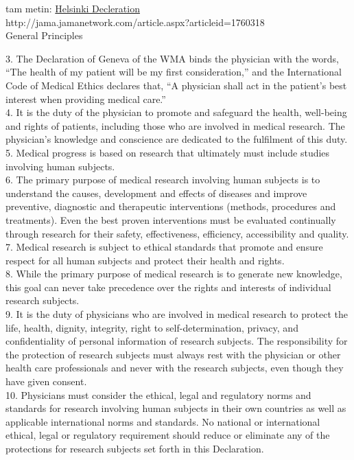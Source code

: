 tam metin: \href{http://jama.jamanetwork.com/article.aspx?articleid=1760318}{Helsinki Decleration}\\
{\tiny http://jama.jamanetwork.com/article.aspx?articleid=1760318}\\

General Principles

3. The Declaration of Geneva of the WMA binds the physician with the words, “The health of my patient will be my first consideration,” and the International Code of Medical Ethics declares that, “A physician shall act in the patient's best interest when providing medical care.”\\
4. It is the duty of the physician to promote and safeguard the health, well-being and rights of patients, including those who are involved in medical research. The physician's knowledge and conscience are dedicated to the fulfilment of this duty.\\
5. Medical progress is based on research that ultimately must include studies involving human subjects.\\
6. The primary purpose of medical research involving human subjects is to understand the causes, development and effects of diseases and improve preventive, diagnostic and therapeutic interventions (methods, procedures and treatments). Even the best proven interventions must be evaluated continually through research for their safety, effectiveness, efficiency, accessibility and quality.\\
7. Medical research is subject to ethical standards that promote and ensure respect for all human subjects and protect their health and rights.\\
8. While the primary purpose of medical research is to generate new knowledge, this goal can never take precedence over the rights and interests of individual research subjects.\\
9. It is the duty of physicians who are involved in medical research to protect the life, health, dignity, integrity, right to self-determination, privacy, and confidentiality of personal information of research subjects. The responsibility for the protection of research subjects must always rest with the physician or other health care professionals and never with the research subjects, even though they have given consent.\\
10. Physicians must consider the ethical, legal and regulatory norms and standards for research involving human subjects in their own countries as well as applicable international norms and standards. No national or international ethical, legal or regulatory requirement should reduce or eliminate any of the protections for research subjects set forth in this Declaration.\\
